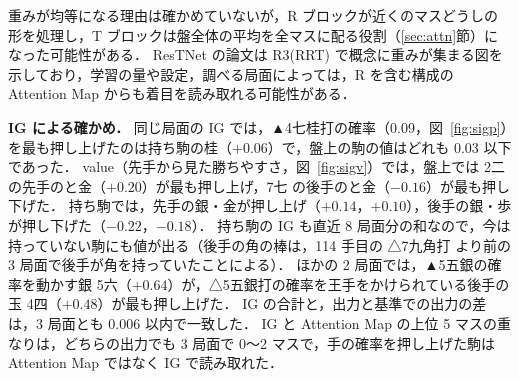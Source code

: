\documentclass[submit]{ipsj}
\begin{document}
重みが均等になる理由は確かめていないが，R ブロックが近くのマスどうしの形を処理し，T ブロックは盤全体の平均を全マスに配る役割（\ref{sec:attn}節）になった可能性がある．
ResTNet の論文は R3(RRT) で概念に重みが集まる図を示しており，学習の量や設定，調べる局面によっては，R を含む構成の Attention Map からも着目を読み取れる可能性がある．

\textbf{IG による確かめ．}
同じ局面の IG では，▲4七桂打の確率（0.09，図~\ref{fig:sigp}）を最も押し上げたのは持ち駒の桂（$+0.06$）で，盤上の駒の値はどれも 0.03 以下であった．
value（先手から見た勝ちやすさ，図~\ref{fig:sigv}）では，盤上では 2二 の先手のと金（$+0.20$）が最も押し上げ，7七 の後手のと金（$-0.16$）が最も押し下げた．
持ち駒では，先手の銀・金が押し上げ（$+0.14$，$+0.10$），後手の銀・歩が押し下げた（$-0.22$，$-0.18$）．
持ち駒の IG も直近 8 局面分の和なので，今は持っていない駒にも値が出る（後手の角の棒は，114 手目の △7九角打 より前の 3 局面で後手が角を持っていたことによる）．
ほかの 2 局面では，▲5五銀の確率を動かす銀 5六（$+0.64$）が，△5五銀打の確率を王手をかけられている後手の玉 4四（$+0.48$）が最も押し上げた．
IG の合計と，出力と基準での出力の差は，3 局面とも 0.006 以内で一致した．
IG と Attention Map の上位 5 マスの重なりは，どちらの出力でも 3 局面で 0〜2 マスで，手の確率を押し上げた駒は Attention Map ではなく IG で読み取れた．
\end{document}
